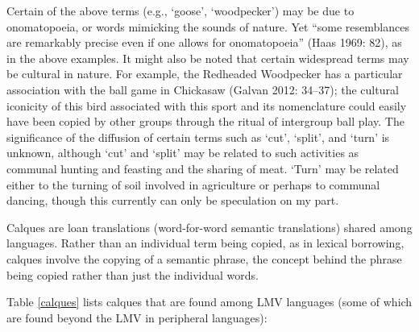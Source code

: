 \documentclass[output=paper]{LSP/langsci}
\begin{document}
\z

\z

Certain of the above terms (e.g., `goose', `woodpecker') may be due to ono\-ma\-to\-poeia, or words mimicking the sounds of nature. Yet “some resemblances are remarkably precise even if one allows for onomatopoeia” (Haas 1969: 82), as in the above examples. It might also be noted that certain widespread terms may be cultural in nature. For example, the Redheaded Woodpecker has a particular association with the ball game in Chickasaw (Galvan 2012: 34--37); the cultural iconicity of this bird associated with this sport and its nomenclature could easily have been copied by other groups through the ritual of intergroup ball play. The significance of the diffusion of certain terms such as `cut', `split', and `turn' is unknown, although `cut' and `split' may be related to such activities as communal hunting and feasting and the sharing of meat. `Turn' may be related either to the turning of soil involved in agriculture or perhaps to communal dancing, though this currently can only be speculation on my part. 

Calques are loan translations (word-for-word semantic translations) shared among languages. Rather than an individual term being copied, as in lexical borrowing, calques involve the copying of a semantic phrase, the concept behind the phrase being copied rather than just the individual words.

Table \ref{calques} lists calques that are found among LMV languages (some of which are found beyond the LMV in peripheral languages): 
\end{document}
